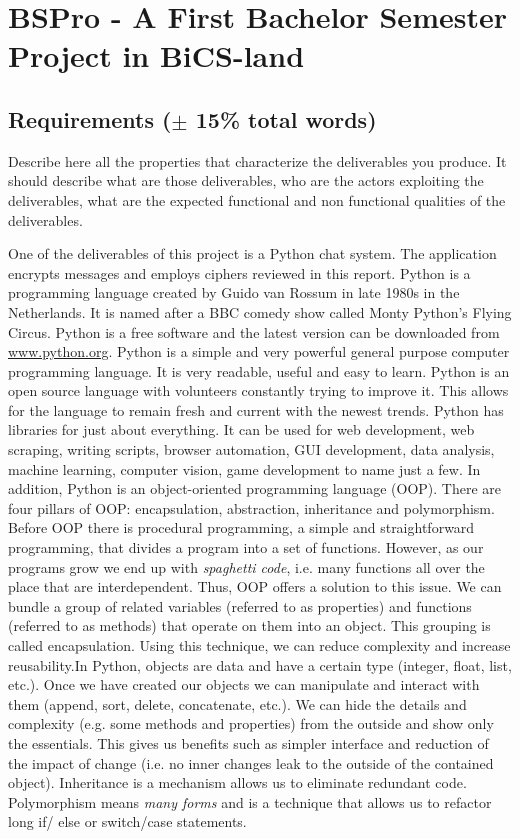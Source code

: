 \section{BSPro - A First Bachelor Semester Project in BiCS-land}
\subsection{Requirements ($\pm$ 15\% total words)}
Describe here all the properties that characterize the deliverables you produce. It should describe what are those deliverables, who are the actors exploiting the deliverables, what are the expected functional and non functional qualities of the deliverables.

One of the deliverables of this project is a Python chat system. The application encrypts messages and employs ciphers reviewed in this report. Python is a programming language created by Guido van Rossum in late 1980s in the Netherlands. It is named after a BBC comedy show called Monty Python's Flying Circus. Python is a free software and the latest version can be downloaded from \url{www.python.org}. Python is a simple and very powerful general purpose computer programming language. It is very readable, useful and easy to learn. Python is an open source language with volunteers constantly trying to improve it. This allows for the language to remain fresh and current with the newest trends. Python has libraries for just about everything. It can be used for web development, web scraping, writing scripts, browser automation, GUI development, data analysis, machine learning, computer vision, game development to name just a few. In addition, Python is an object-oriented programming language (OOP). There are four pillars of OOP: encapsulation, abstraction, inheritance and polymorphism. Before OOP there is procedural programming, a simple and straightforward programming, that divides a program into a set of functions. However, as our programs grow we end up with \emph{spaghetti code}, i.e. many functions all over the place that are interdependent. Thus, OOP offers a solution to this issue. We can bundle a group of related variables (referred to as properties) and functions (referred to as methods) that operate on them into an object. This grouping is called encapsulation. Using this technique, we can reduce complexity and increase reusability.In Python, objects are data and have a certain type (integer, float, list, etc.). Once we have created our objects we can manipulate and interact with them (append, sort, delete, concatenate, etc.). We can hide the details and complexity (e.g. some methods and properties) from the outside and show only the essentials. This gives us benefits such as simpler interface and reduction of the impact of change (i.e. no inner changes leak to the outside of the contained object). Inheritance is a mechanism allows us to eliminate redundant code. Polymorphism means \emph{many forms} and is a technique that allows us to refactor long if/ else or switch/case statements. 

